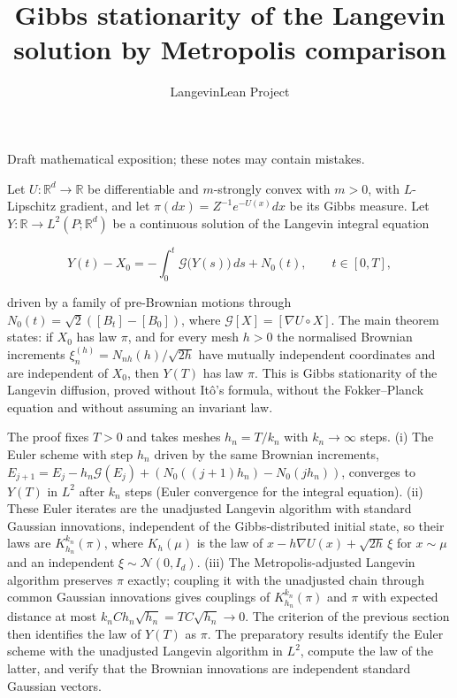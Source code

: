 \documentclass[11pt,a4paper]{article}
\title{\texorpdfstring{Gibbs stationarity of the Langevin solution by Metropolis comparison}{Gibbs stationarity of the Langevin solution by Metropolis comparison}}
\author{LangevinLean Project}
\date{}
\begin{document}
\maketitle
Draft mathematical exposition; these notes may contain mistakes.


Let \(U:\mathbb R^d\to\mathbb R\) be differentiable and \(m\)-strongly convex with \(m>0\), with \(L\)-Lipschitz gradient, and let \(\pi(dx)=Z^{-1}e^{-U(x)}dx\) be its Gibbs measure. Let \(Y:\mathbb R\to L^2(P;\mathbb R^d)\) be a continuous solution of the Langevin integral equation


\[Y(t)-X_0=-\int_0^t\mathcal G\bigl(Y(s)\bigr)\,ds+N_0(t),\qquad t\in[0,T],\]


driven by a family of pre-Brownian motions through \(N_0(t)=\sqrt2([B_t]-[B_0])\), where \(\mathcal G[X]=[\nabla U\circ X]\). The main theorem states: if \(X_0\) has law \(\pi\), and for every mesh \(h>0\) the normalised Brownian increments \(\xi^{(h)}_{n}=N_{nh}(h)/\sqrt{2h}\) have mutually independent coordinates and are independent of \(X_0\), then \(Y(T)\) has law \(\pi\). This is Gibbs stationarity of the Langevin diffusion, proved without Itô's formula, without the Fokker–Planck equation and without assuming an invariant law.




The proof fixes \(T>0\) and takes meshes \(h_n=T/k_n\) with \(k_n\to\infty\) steps. (i) The Euler scheme with step \(h_n\) driven by the same Brownian increments, \(E_{j+1}=E_j-h_n\mathcal G(E_j)+(N_0((j+1)h_n)-N_0(jh_n))\), converges to \(Y(T)\) in \(L^2\) after \(k_n\) steps (Euler convergence for the integral equation). (ii) These Euler iterates are the unadjusted Langevin algorithm with standard Gaussian innovations, independent of the Gibbs-distributed initial state, so their laws are \(K_{h_n}^{k_n}(\pi)\), where \(K_h(\mu)\) is the law of \(x-h\nabla U(x)+\sqrt{2h}\,\xi\) for \(x\sim\mu\) and an independent \(\xi\sim\mathcal N(0,I_d)\). (iii) The Metropolis-adjusted Langevin algorithm preserves \(\pi\) exactly; coupling it with the unadjusted chain through common Gaussian innovations gives couplings of \(K_{h_n}^{k_n}(\pi)\) and \(\pi\) with expected distance at most \(k_nCh_n\sqrt{h_n}=TC\sqrt{h_n}\to0\). The criterion of the previous section then identifies the law of \(Y(T)\) as \(\pi\). The preparatory results identify the Euler scheme with the unadjusted Langevin algorithm in \(L^2\), compute the law of the latter, and verify that the Brownian innovations are independent standard Gaussian vectors.
\end{document}
